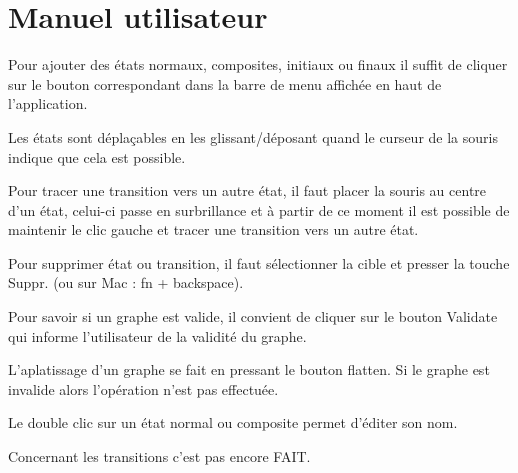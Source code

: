 \section{Manuel utilisateur}

Pour ajouter des états normaux, composites, initiaux ou finaux il suffit de cliquer sur le bouton correspondant dans la barre de menu affichée en haut de l'application.


Les états sont déplaçables en les glissant/déposant quand le curseur de la souris indique que cela est possible.

Pour tracer une transition vers un autre état, il faut placer la souris au centre d'un état, celui-ci passe en surbrillance et à partir de ce moment il est possible de maintenir le clic gauche et tracer une transition vers un autre état.

Pour supprimer état ou transition, il faut sélectionner la cible et presser la touche Suppr. (ou sur Mac : fn + backspace).

Pour savoir si un graphe est valide, il convient de cliquer sur le bouton Validate qui informe l'utilisateur de la validité du graphe.

L'aplatissage d'un graphe se fait en pressant le bouton flatten. Si le graphe est invalide alors l'opération n'est pas effectuée.

Le double clic sur un état normal ou composite permet d'éditer son nom.

Concernant les transitions c'est pas encore FAIT.